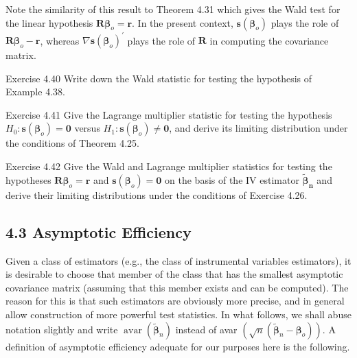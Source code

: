 \documentclass[10pt]{article}
\begin{document}
Note the similarity of this result to Theorem 4.31 which gives the Wald test for the linear hypothesis $\mathbf{R} \boldsymbol{\beta}_{o}=\mathbf{r}$. In the present context, $\mathbf{s}\left(\boldsymbol{\beta}_{o}\right)$ plays the role of $\mathbf{R} \boldsymbol{\beta}_{o}-\mathbf{r}$, whereas $\nabla \mathbf{s}\left(\boldsymbol{\beta}_{o}\right)^{\prime}$ plays the role of $\mathbf{R}$ in computing the covariance matrix.

Exercise 4.40 Write down the Wald statistic for testing the hypothesis of Example 4.38.

Exercise 4.41 Give the Lagrange multiplier statistic for testing the hypothesis $H_{0}: \mathbf{s}\left(\boldsymbol{\beta}_{o}\right)=\mathbf{0}$ versus $H_{1}: \mathbf{s}\left(\boldsymbol{\beta}_{o}\right) \neq \mathbf{0}$, and derive its limiting distribution under the conditions of Theorem 4.25.

Exercise 4.42 Give the Wald and Lagrange multiplier statistics for testing the hypotheses $\mathbf{R} \boldsymbol{\beta}_{o}=\mathbf{r}$ and $\mathbf{s}\left(\boldsymbol{\beta}_{o}\right)=\mathbf{0}$ on the basis of the IV estimator $\tilde{\boldsymbol{\beta}}_{\boldsymbol{n}}$ and derive their limiting distributions under the conditions of Exercise 4.26.

\subsection*{4.3 Asymptotic Efficiency}
Given a class of estimators (e.g., the class of instrumental variables estimators), it is desirable to choose that member of the class that has the smallest asymptotic covariance matrix (assuming that this member exists and can be computed). The reason for this is that such estimators are obviously more precise, and in general allow construction of more powerful test statistics. In what follows, we shall abuse notation slightly and write $\operatorname{avar}\left(\tilde{\boldsymbol{\beta}}_{n}\right)$ instead of avar $\left(\sqrt{n}\left(\tilde{\boldsymbol{\beta}}_{n}-\boldsymbol{\beta}_{o}\right)\right)$. A definition of asymptotic efficiency adequate for our purposes here is the following.
\end{document}
